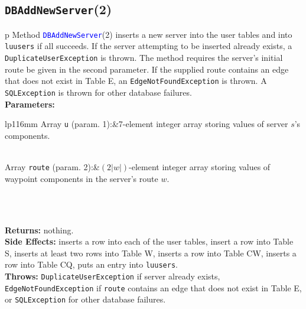 \subsection{\texttt{DBAddNewServer}(2)}
\begin{tabular}{p{\textwidth}}
\toprule
{}
Method \textcolor{blue}{{\tt{}DBAddNewServer}}(2) inserts a new server into the
user tables and into {\tt{}lu{}users} if all succeeds.  If the server attempting to
be inserted already exists, a {\tt{}DuplicateUserException} is thrown. The method
requires the server's initial route be given in the second parameter. If the
supplied route contains an edge that does not exist in Table E, an
{\tt{}EdgeNotFoundException} is thrown. A {\tt{}SQLException} is thrown for other
database failures.\\
\midrule
\textbf{Parameters:} \\
\begin{tabular}{lp{116mm}}
Array {\tt{}u} (param. 1):&7-element integer array storing values of
server $s$'s components.

\\
Array {\tt{}route} (param. 2):&$(2|w|)$-element integer array storing values of
waypoint components in the server's route $w$.

\\
\end{tabular}\\
\textbf{Returns:} nothing.\\
\textbf{Side Effects:} inserts a row into each of the user tables, insert a
row into Table S, inserts at least two rows into Table W, inserts a row into Table CW,
inserts a row into Table CQ, puts an entry into {\tt{}lu{}users}.\\
\textbf{Throws:} {\tt{}DuplicateUserException} if server already exists,
{\tt{}EdgeNotFoundException} if {\tt{}route} contains an edge that does not exist
in Table E, or {\tt{}SQLException} for other database failures.\\
\bottomrule
\end{tabular}
